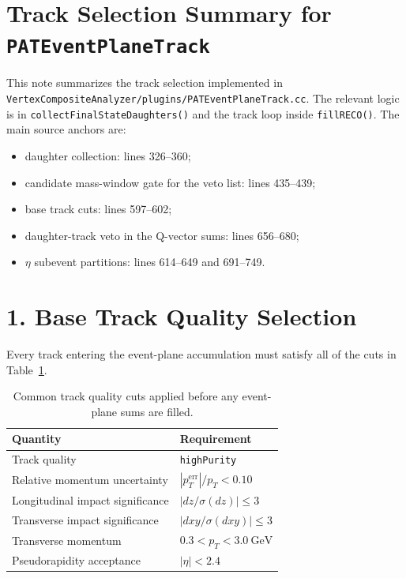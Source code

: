 \documentclass[11pt]{article}
\begin{document}
\section*{Track Selection Summary for \texttt{PATEventPlaneTrack}}

This note summarizes the track selection implemented in
\texttt{VertexCompositeAnalyzer/plugins/PATEventPlaneTrack.cc}.
The relevant logic is in \texttt{collectFinalStateDaughters()} and the track loop
inside \texttt{fillRECO()}.
The main source anchors are:
\begin{itemize}
\item daughter collection: lines 326--360;
\item candidate mass-window gate for the veto list: lines 435--439;
\item base track cuts: lines 597--602;
\item daughter-track veto in the Q-vector sums: lines 656--680;
\item $\eta$ subevent partitions: lines 614--649 and 691--749.
\end{itemize}

\section*{1. Base Track Quality Selection}

Every track entering the event-plane accumulation must satisfy all of the cuts in
Table~\ref{tab:basecuts}.

\begin{table}[h]
\centering
\begin{tabular}{ll}
\toprule
Quantity & Requirement \\
\midrule
Track quality & \texttt{highPurity} \\
Relative momentum uncertainty & $|p_{T}^{\mathrm{err}}| / p_{T} < 0.10$ \\
Longitudinal impact significance & $\left|dz/\sigma(dz)\right| \le 3$ \\
Transverse impact significance & $\left|dxy/\sigma(dxy)\right| \le 3$ \\
Transverse momentum & $0.3 < p_{T} < 3.0~\mathrm{GeV}$ \\
Pseudorapidity acceptance & $|\eta| < 2.4$ \\
\bottomrule
\end{tabular}
\caption{Common track quality cuts applied before any event-plane sums are filled.}
\label{tab:basecuts}
\end{table}
\end{document}
